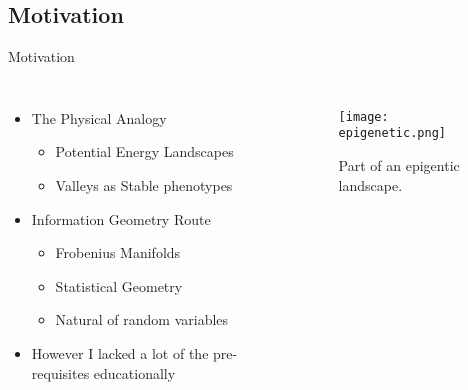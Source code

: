 \documentclass[aspectratio=169, onlytextwidth,  notheorems, sOuRcEs, fleqn, leqno, ]{RUCPresentation}
\begin{document}
\subsection{ Motivation }
\begin{frame}{ Motivation }
    \vspace{1em}

    \begin{columns}

        \column{0.45\framewidth}
        \begin{itemize}[<+->]
            \item The Physical Analogy
                \begin{itemize}[<.->]
                    \item Potential Energy Landscapes
                    \item Valleys as Stable phenotypes
                \end{itemize}
            \item Information Geometry Route
                \begin{itemize}[<.->]
                    \item Frobenius Manifolds%
                    \item Statistical Geometry %
                    \item Natural of random variables
                \end{itemize}
            \item However I lacked a lot of the pre-requisites educationally
        \end{itemize}


        \column{0.60\framewidth}

        \begin{figure}[htbp]
        \centering
        \texttt{[image: epigenetic.png]}
        \caption{Part of an epigentic landscape.}
        \end{figure}




    \end{columns}


\end{frame}
\end{document}
